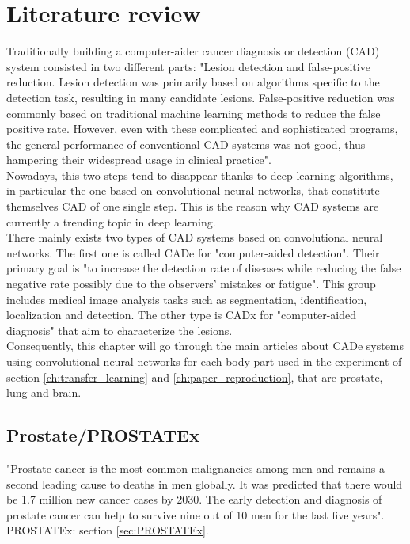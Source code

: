 
\chapter{Literature review}
\label{ch:literature_review}

Traditionally building a computer-aider cancer diagnosis or detection (CAD) system consisted in two different parts: "Lesion  detection  and  false-positive  reduction.  Lesion  detection  was  primarily  based  on  algorithms  specific  to  the  detection task, resulting in many candidate lesions. False-positive reduction was commonly based on traditional  machine  learning  methods  to  reduce  the  false  positive  rate. However,  even  with  these  complicated and sophisticated programs, the general performance of conventional CAD systems was not good, thus hampering their widespread usage in clinical practice"\cite{41}.\\
Nowadays, this two steps tend to disappear thanks to deep learning algorithms, in particular the one based on convolutional neural networks, that constitute themselves CAD of one single step. This is the reason why CAD systems are currently a trending topic in deep learning.\\
There mainly exists two types of CAD systems based on convolutional neural networks. The first one is called CADe for "computer-aided detection". Their primary goal is "to increase the detection rate of diseases while reducing the false negative  rate  possibly  due  to  the  observers’  mistakes  or  fatigue"\cite{41}. This group includes medical  image  analysis  tasks  such  as  segmentation,  identification,  localization  and  detection. The other type is CADx for "computer-aided diagnosis" that aim to characterize the lesions.\\
Consequently, this chapter will go through the main articles about CADe systems using convolutional neural networks for each body part used in the experiment of section \ref{ch:transfer_learning} and \ref{ch:paper_reproduction}, that are prostate, lung and brain.

\section{Prostate/PROSTATEx}
"Prostate  cancer  is  the  most  common  malignancies  among  men  and  remains  a  second  leading  cause to deaths in men globally. It was predicted that there would be 1.7 million new cancer cases by 2030. The early detection and diagnosis of prostate cancer can help to survive nine out of 10 men for the last five years"\cite{41}.
PROSTATEx: section \ref{sec:PROSTATEx}.

